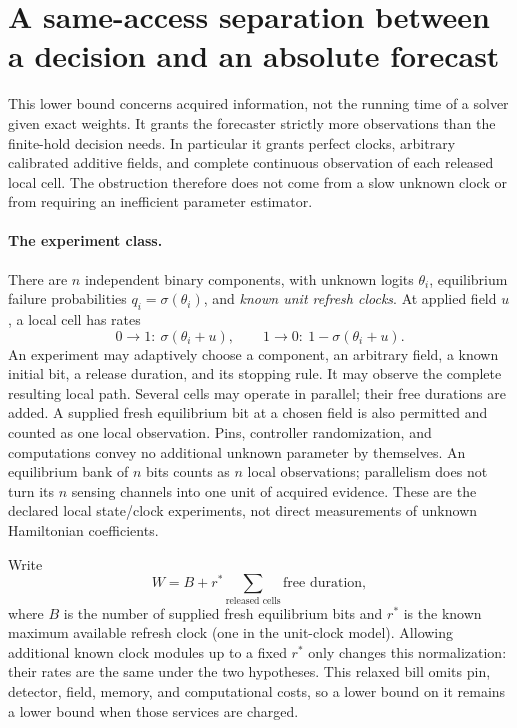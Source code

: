 \section{A same-access separation between a decision and an absolute forecast}
\label{sec:sameaccesslower}

This lower bound concerns acquired information, not the running time of a
solver given exact weights.  It grants the forecaster strictly more
observations than the finite-hold decision needs.  In particular it grants
perfect clocks, arbitrary calibrated additive fields, and complete continuous
observation of each released local cell.  The obstruction therefore does not
come from a slow unknown clock or from requiring an inefficient parameter
estimator.

\paragraph{The experiment class.}
There are $n$ independent binary components, with unknown logits
$\theta_i$, equilibrium failure probabilities $q_i=\sigma(\theta_i)$,
and \emph{known unit refresh clocks}.  At applied field $u$, a local cell
has rates
\[
  0\longrightarrow1:\ \sigma(\theta_i+u),\qquad
  1\longrightarrow0:\ 1-\sigma(\theta_i+u).
\]
An experiment may adaptively choose a component, an arbitrary field, a
known initial bit, a release duration, and its stopping rule.  It may observe
the complete resulting local path.  Several cells may operate in parallel;
their free durations are added.  A supplied fresh equilibrium bit at a
chosen field is also permitted and counted as one local observation.  Pins,
controller randomization, and computations convey no additional unknown
parameter by themselves.  An equilibrium bank of $n$ bits counts as $n$
local observations; parallelism does not turn its $n$ sensing channels into
one unit of acquired evidence.  These are the declared local state/clock
experiments, not direct measurements of unknown Hamiltonian coefficients.

Write
\[
  W=B+r^*\sum_{\text{released cells}} \text{free duration},
\]
where $B$ is the number of supplied fresh equilibrium bits and $r^*$ is
the known maximum available refresh clock (one in the unit-clock model).
Allowing additional known clock modules up to a fixed $r^*$ only changes
this normalization: their rates are the same under the two hypotheses.
This relaxed
bill omits pin, detector, field, memory, and computational costs, so a lower
bound on it remains a lower bound when those services are charged.

